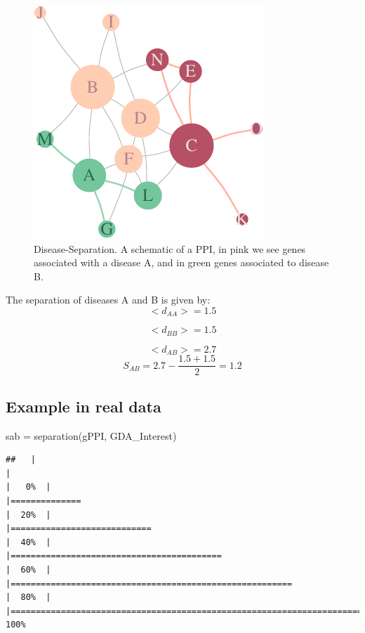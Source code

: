 \documentclass[
]{book}
\newenvironment{Shaded}{\begin{snugshade}}{\end{snugshade}}
\newcommand{\FunctionTok}[1]{\textcolor[rgb]{0.00,0.00,0.00}{#1}}
\newcommand{\NormalTok}[1]{#1}
\newcommand{\OtherTok}[1]{\textcolor[rgb]{0.56,0.35,0.01}{#1}}
\begin{document}
\begin{figure}
\centering
\includegraphics{NetMed_files/figure-latex/separation-1.pdf}
\caption{\label{fig:separation}Disease-Separation. A schematic of a PPI, in pink we see genes associated with a disease A, and in green genes associated to disease B.}
\end{figure}

The separation of diseases A and B is given by: \[
<d_{AA}> = 1.5
\]

\[
<d_{BB}> = 1.5
\]

\[
<d_{AB}> = 2.7
\] \[
S_{AB} = 2.7 - \frac{1.5+ 1.5}2 = 1.2
\]

\hypertarget{example-in-real-data-1}{%
\subsection{Example in real data}\label{example-in-real-data-1}}

\begin{Shaded}
\begin{Highlighting}[]
\NormalTok{sab }\OtherTok{=} \FunctionTok{separation}\NormalTok{(gPPI, GDA\_Interest)}
\end{Highlighting}
\end{Shaded}

\begin{verbatim}
##   |                                                                              |                                                                      |   0%  |                                                                              |==============                                                        |  20%  |                                                                              |============================                                          |  40%  |                                                                              |==========================================                            |  60%  |                                                                              |========================================================              |  80%  |                                                                              |======================================================================| 100%
\end{verbatim}
\end{document}
